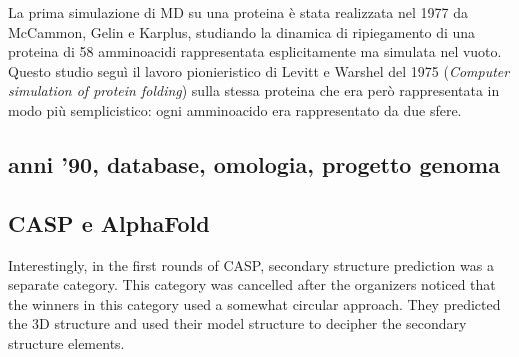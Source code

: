 \par La prima simulazione di MD su una proteina è stata realizzata nel 1977 da McCammon, Gelin e Karplus\supercite{mccammon1977dynamics}, studiando la dinamica di ripiegamento di una proteina di 58 amminoacidi rappresentata esplicitamente ma simulata nel vuoto. Questo studio seguì il lavoro pionieristico di Levitt e Warshel del 1975 (\textit{Computer simulation of protein folding}\supercite{levitt1975computer}) sulla stessa proteina che era però rappresentata in modo più semplicistico: ogni amminoacido era rappresentato da due sfere. 



\subsection{anni '90, database, omologia, progetto genoma}
\subsection{CASP e AlphaFold}



Interestingly, in the first rounds of CASP, secondary structure prediction was a separate category. This
category was cancelled after the organizers noticed that the winners in this category used a somewhat circular
approach. They predicted the 3D structure and used their model structure to decipher the secondary structure
elements.

\clearpage